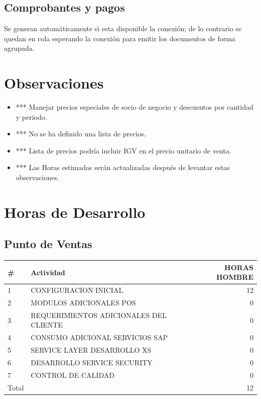 \documentclass[pdftex,12pt,oneside,a4paper,spanish, english, brazil]{abntex2}
\begin{document}
\begin{sloppypar}
             \section{Comprobantes y pagos}
                Se generan automáticamente si esta disponible la conexión; de lo contrario se quedan en cola esperando la conexión para emitir los documentos de forma agrupada.
             \chapter{Observaciones}
             \begin{itemize}
             	\item *** Manejar precios especiales de socio de negocio y descuentos por cantidad y periodo.
             	\item *** No se ha definido una lista de precios.
             	\item *** Lista de precios podría incluir IGV en el precio unitario de venta.
             	\item *** Las Horas estimadas serán actualizadas después de levantar estas observaciones.
             \end{itemize}
             \chapter{Horas de Desarrollo}
             \section{Punto de Ventas}
             \begin{table}[htbp]
             	\small
             	\centering
             	
             	\begin{tabular}{llr}       		
             		\# & Actividad & HORAS HOMBRE\\
             		\midrule
             		1 &	CONFIGURACION INICIAL	& 12 \\
             		2 &	MODULOS ADICIONALES POS	& 0 \\
             		3 &	REQUERIMIENTOS ADICIONALES DEL CLIENTE	& 0 \\
             		4 &	CONSUMO ADICIONAL SERVICIOS SAP	& 0 \\
             		5 &	SERVICE LAYER DESARROLLO XS	& 0 \\
             		6 &	DESARROLLO SERVICE SECURITY	& 0 \\
             		7 &	CONTROL DE CALIDAD	& 0 \\
             		\bottomrule
             		Total & &12 \\
             	\end{tabular}%
             \end{table}%

\end{sloppypar}
\end{document}
